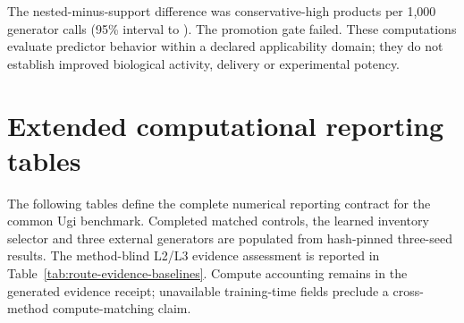 \documentclass{article}
\begin{document}
\begin{table}[H]
\caption{\textbf{Predicted HeLa messenger-transfection potential under matched generation budgets.}
The support-enriched arm uses the already promoted applicability proposal; the nested arm reallocates
morphology mass using the frozen weak potency signal. Conservative-high counts are computational
predictions, not transfection measurements. The comparison uses the same generator-call and oracle
budgets.}
\label{tab:hela-property-guidance}
\centering
\scriptsize
\setlength{\tabcolsep}{5.0pt}
\end{table}

The nested-minus-support difference was \ForgePotencyDifferencePerThousand{} conservative-high
products per 1,000 generator calls (95\% interval \ForgePotencyDifferenceCILowPerThousand{} to
\ForgePotencyDifferenceCIHighPerThousand). The promotion gate failed. These computations evaluate
predictor behavior within a declared applicability domain; they do not establish improved biological
activity, delivery or experimental potency.

\clearpage

\section{Extended computational reporting tables}
\label{app:reporting}

The following tables define the complete numerical reporting contract for the common Ugi benchmark.
Completed matched controls, the learned inventory selector and three external generators are
populated from hash-pinned three-seed results. The method-blind L2/L3 evidence assessment is reported
in Table~\ref{tab:route-evidence-baselines}. Compute accounting remains in the generated evidence
receipt; unavailable training-time fields preclude a cross-method compute-matching claim.
\end{document}
